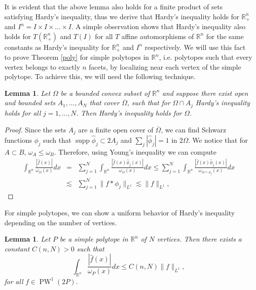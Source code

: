 \documentclass[footinclude=true]{amsart}
\theoremstyle{plain}
\newtheorem{lm}[theo]{Lemma}
\DeclareMathOperator{\PW}{PW}
\DeclareMathOperator{\supp}{supp}
\begin{document}
	It is evident that the above lemma also holds for a finite product of sets satisfying Hardy's inequality, thus we derive that Hardy's inequality holds for $\mathbb{R}^{n}_{+}$ and $I^{n}=I\times I\times...\times I$. A simple observation shows that Hardy's inequality also holds for $T(\mathbb{R}^{n}_{+})$ and $T(I)$ for all $T$ affine automorphisms of $\mathbb{R}^{n}$ for the same constants as Hardy's inequality for $\mathbb{R}_{+}^n$ and $I^n$ respectively. We will use this fact to prove Theorem \ref{poly} for simple polytopes in $\mathbb{R}^n$, i.e. polytopes such that every vertex belongs to exactly $n$ facets, by localizing near each vertex of the simple polytope. To achieve this, we will need the following technique.
	\begin{lm}\label{decomp}
		Let $\Omega$ be a bounded convex subset of $\mathbb{R}^{n}$ and suppose there exist open and bounded sets $A_1,..., A_N$ that cover $\overline{\Omega}$, such that for $\Omega\cap A_{j}$ Hardy's inequality holds for all $j=1,...,N$. Then Hardy's inequality holds for $\Omega$.
	\end{lm}
	\begin{proof}
		Since the sets $A_j$ are a finite open cover of $\overline{\Omega}$, we can find Schwarz functions $\phi_j$ such that $\supp\widehat{\phi}_{j}\subset 2A_j$ and $\sum_j |\widehat{\phi}_{j}|=1$ in $2\Omega$. 
		We notice that for $A\subset B$, $\omega_{A}\leq \omega_{B}$. Therefore, using Young's inequality we can compute
		\begin{eqnarray}
			\int_{\mathbb{R}^{n}} \frac{|\widehat{f}(x)|}{\omega_{\Omega}(x)}dx&=& \sum_{j=1}^N\int_{\mathbb{R}^{n}} \frac{|\widehat{f}(x)\widehat{\phi}_{j}(x)|}{\omega_{\Omega}(x)}dx\leq \sum_{j=1}^N\int_{\mathbb{R}^{n}} \frac{|\widehat{f}(x)\widehat{\phi}_{j}(x)|}{\omega_{\Omega\cap A_j}(x)}dx \nonumber \\
			&\lesssim&  \sum_{j=1}^N \|f\ast\phi_j\|_{L^{1}} \lesssim \|f\|_{L^{1}}, \nonumber  
		\end{eqnarray}
	\end{proof}
	For simple polytopes, we can show a uniform behavior of Hardy's inequality depending on the number of vertices.
	\begin{lm}\label{polyt}
		Let $P$ be a simple polytope in $\mathbb{R}^{n}$ of $N$ vertices. Then there exists a constant $C(n,N)>0$ such that
		$$\int_{\mathbb{R}^{n}}\dfrac{|\widehat{f}(x)|}{\omega_{P}(x)}dx\leq C(n,N)\|f\|_{L^{1}},$$ for all $f\in\PW^1(2P)$.
	\end{lm}
\end{document}
